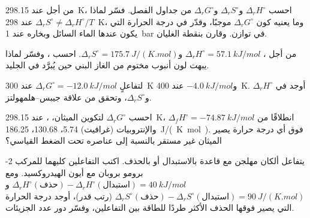 \begin{exercise}[$\star\star$]\label{exo:b2:reaction-free-energy:5}
من أجل  عند \qty{298.15}{K}، احسب $\Delta_r H^\circ$
و$\Delta_r S^\circ$ و$\Delta_r G^\circ$ من جداول الفصل.
فسّر لماذا $\Delta_r S^\circ \neq \Delta_r H^\circ/T$ عند \qty{298}{K}، وما
يعنيه كون $\Delta_r G^\circ$ موجبًا، وقدّر في 
درجة الحرارة التي يكون عندها الماء السائل وبخاره عند
\qty{1}{bar} في توازن. وقارن بنقطة الغليان.
\end{exercise}

\begin{exercise}[$\star\star$]\label{exo:b2:reaction-free-energy:6}
من أجل ، $\Delta_r H^\circ = \qty{57.1}{kJ/mol}$
و$\Delta_r S^\circ = \qty{175.7}{J/(K.mol)}$. احسب ،
وفسّر لماذا يبهت لون أنبوب مختوم من الغاز البني 
حين يُبرَّد في الجليد.
\end{exercise}

\begin{exercise}[$\star\star$]\label{exo:b2:reaction-free-energy:7}
لتفاعلٍ $\Delta_r G^\circ = \qty{-12.0}{kJ/mol}$ عند \qty{300}{K}
و$\qty{-4.0}{kJ/mol}$ عند \qty{400}{K}. أوجد في 
$\Delta_r H^\circ$ و$\Delta_r S^\circ$، وتحقق من علاقة
جيبس--هلمهولتز.
\end{exercise}

\begin{exercise}[$\star\star$]\label{exo:b2:reaction-free-energy:8}
احسب $\Delta_r G^\circ$ لتكوين الميثان، ، عند \qty{298.15}{K}، انطلاقًا من $\Delta_f H^\circ = \qty{-74.87}{kJ/mol}$
والإنتروبيات  (غرافيت) 5.74،  130.68، 
\qty{186.25}{J/(K.mol)}. فوق أي درجة حرارة يصير الميثان غير مستقر بالنسبة
إلى عناصره تحت الضغط القياسي؟
\end{exercise}

\begin{exercise}[$\star\star$]\label{exo:b2:reaction-free-energy:9}
يتفاعل ألكان مهلجن مع قاعدة بالاستبدال أو بالحذف. اكتب التفاعلين كليهما
للمركب 2-برومو بروبان مع أيون الهيدروكسيد. ومع $\Delta_r
H^\circ(\text{حذف}) - \Delta_r H^\circ(\text{استبدال}) =
\qty{+40}{kJ/mol}$ و$\Delta_r S^\circ(\text{حذف}) - \Delta_r
S^\circ(\text{استبدال}) = \qty{+90}{J/(K.mol)}$ (رتب قدر)،
أوجد درجة الحرارة التي يصير فوقها الحذف الأكثر طردًا للطاقة بين
التفاعلين، وفسّر دور عدد الجزيئات.
\end{exercise}

